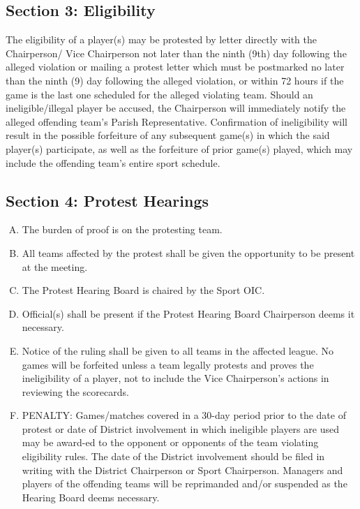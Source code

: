 \documentclass[draft]{memoir}
\begin{document}
\subsection{Section 3: Eligibility}
The eligibility of a player(s) may be protested by letter directly with the Chairperson/ Vice Chairperson not later than the ninth (9th) day following the alleged violation or mailing a protest letter which must be postmarked no later than the ninth (9) day following the alleged violation, or within 72 hours if the game is the last one scheduled for the alleged violating team.  Should an ineligible/illegal player be accused, the Chairperson will immediately notify the alleged offending team’s Parish Representative. Confirmation of ineligibility will result in the possible forfeiture of any subsequent game(s) in which the said player(s) participate, as well as the forfeiture of prior game(s) played, which may include the offending team’s entire sport schedule.

\subsection{Section 4: Protest Hearings}
\begin{enumerate}[A.]
    \item The burden of proof is on the protesting team.
    \item All teams affected by the protest shall be given the opportunity to be present at the meeting.
    \item The Protest Hearing Board is chaired by the Sport OIC.
    \item Official(s) shall be present if the Protest Hearing Board Chairperson deems it necessary.
    \item Notice of the ruling shall be given to all teams in the affected league.  No games will be forfeited unless a team legally protests and proves the ineligibility of a player, not to include the Vice Chairperson’s actions in reviewing the scorecards.
    \item PENALTY: Games/matches covered in a 30-day period prior to the date of protest or date of District involvement in which ineligible players are used may be award-ed to the opponent or opponents of the team violating eligibility rules. The date of the District involvement should be filed in writing with the District Chairperson or Sport Chairperson. Managers and players of the offending teams will be reprimanded and/or suspended as the Hearing Board deems necessary.
\end{enumerate}
\end{document}
